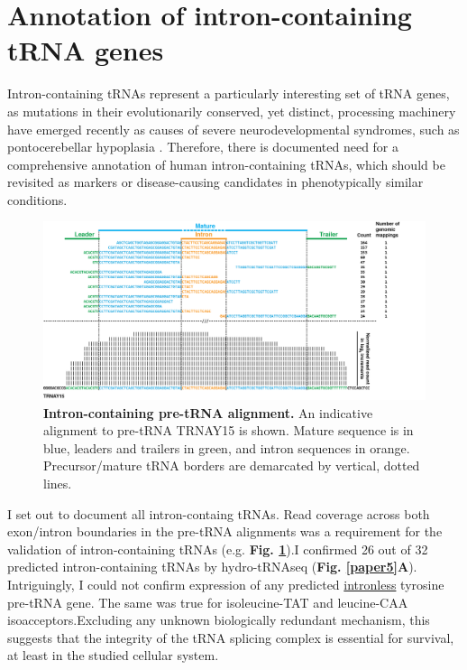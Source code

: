 \documentclass[12pt]{rockefeller}
\begin{document}
\section{Annotation of intron-containing tRNA genes} \label{introns}

Intron-containing tRNAs represent a particularly interesting set of tRNA genes, as mutations in their evolutionarily conserved, yet distinct, processing machinery have emerged recently as causes of severe neurodevelopmental syndromes, such as pontocerebellar hypoplasia \cite{Cooper:2009da,Namavar:2011ew,Weitzer:2014bi}. Therefore, there is documented need for a comprehensive annotation of human intron-containing tRNAs, which should be revisited as markers or disease-causing candidates in phenotypically similar conditions. 

\begin{figure}[!ht]%
\centering
\includegraphics[width=\textwidth]{intron_trna.png}%
\caption[Intron-containing pre-tRNA alignment.]
{\textbf{Intron-containing pre-tRNA alignment.} An indicative alignment to pre-tRNA TRNAY15 is shown. Mature sequence is in blue, leaders and trailers in green, and intron sequences in orange. Precursor/mature tRNA borders are demarcated by vertical, dotted lines.}
\centering
\label{intron_trna}%
\end{figure}

I set out to document all intron-containg tRNAs. Read coverage across both exon/intron boundaries in the pre-tRNA alignments was a requirement for the validation of intron-containing tRNAs (e.g. \textbf{Fig. \ref{intron_trna}}).I confirmed 26 out of 32 predicted intron-containing tRNAs by hydro-tRNAseq (\textbf{Fig. \ref{paper5}A}).  Intriguingly, I could not confirm expression of any predicted \underline{intronless} tyrosine pre-tRNA gene. The same was true for isoleucine-TAT and leucine-CAA isoacceptors.Excluding any unknown biologically redundant mechanism, this suggests that the integrity of the tRNA splicing complex is essential for survival, at least in the studied cellular system. 
\end{document}
